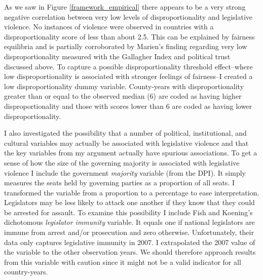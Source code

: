 \documentclass[a4paper]{article}\usepackage[]{graphicx}\usepackage[]{color}
\begin{document}
As we saw in Figure \ref{framework_empirical} there appears to be a very strong negative correlation between very low levels of disproportionality and legislative violence. No instances of violence were observed in countries with a disproportionality score of less than about 2.5. This can be explained by fairness equilibria and is partially corroborated by Marien's \citeyearpar{Marien2011} finding regarding very low disproportionality measured with the Gallagher Index and political trust discussed above. To capture a possible disproportionality threshold effect--where low disproportionality is associated with stronger feelings of fairness--I created a low disproportionality dummy variable. County-years with disproportionality greater than or equal to the observed median (6) are coded as having higher disproportionality and those with scores lower than 6 are coded as having lower disproportionality. 

I also investigated the possibility that a number of political, institutional, and cultural variables may actually be associated with legislative violence and that the key variables from my argument actually have spurious associations. To get a sense of how the size of the governing majority is associated with legislative violence I include the government {\emph{majority}} variable (from the DPI). It simply measures the seats held by governing parties as a proportion of all seats. I transformed the variable from a proportion to a percentage to ease interpretation. Legislators may be less likely to attack one another if they know that they could be arrested for assault. To examine this possibility I include Fish and Koening's \citeyearpar{Fish2009} dichotomous \emph{legislator immunity} variable. It equals one if national legislators are immune from arrest and/or prosecution and zero otherwise. Unfortunately, their data only captures legislative immunity in 2007. I extrapolated the 2007 value of the variable to the other observation years. We should therefore approach results from this variable with caution since it might not be a valid indicator for all country-years.
\end{document}
